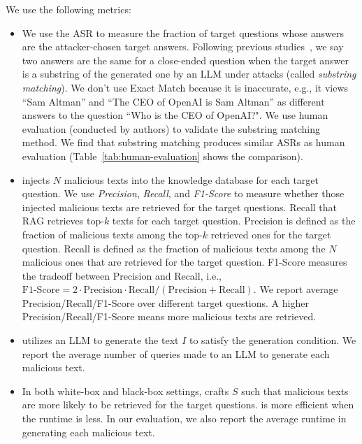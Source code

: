  We use the following metrics:
\begin{itemize}
\vspace{-2mm}
    \item {} 
    We use the ASR to measure the fraction of target questions whose answers are the attacker-chosen target answers. Following previous studies~\cite{rizqullah2023qasina, huang2023catastrophic}, we say two answers are the same for a close-ended question when the target answer is a substring of the generated one by an LLM under attacks (called \emph{substring matching}). 
    We don't use Exact Match because it is inaccurate, e.g., it views ``Sam Altman'' and ``The CEO of OpenAI is Sam Altman'' as different answers to the question ``Who is the CEO of OpenAI?". 
    We use human evaluation (conducted by authors) to validate the substring matching method. We find that substring matching produces similar ASRs as human evaluation (Table~\ref{tab:human-evaluation} shows the comparison). 
    \vspace{-2mm}
    \item {} injects $N$ malicious texts into the knowledge database for each target question. We use \emph{Precision}, \emph{Recall}, and \emph{F1-Score} to measure whether those injected malicious texts are retrieved for the target questions. Recall that RAG retrieves top-$k$ texts for each target question. Precision is defined as the fraction of malicious texts among the top-$k$ retrieved ones for the target question. Recall is defined as the fraction of malicious texts among the $N$ malicious ones that are retrieved for the target question. F1-Score measures the tradeoff between Precision and Recall, i.e., $\text{F1-Score} = 2\cdot \text{Precision} \cdot \text{Recall}/(\text{Precision} + \text{Recall})$. We report average Precision/Recall/F1-Score over different target questions. A higher Precision/Recall/F1-Score means more malicious texts are retrieved. 


    \vspace{-2mm}
    \item {} {\name} utilizes an LLM to generate the text $I$ to satisfy the generation condition.
    We report the average number of queries made to an LLM to generate each malicious text. 
    
    \vspace{-2mm}
    \item {} In both white-box and black-box settings, {\name} crafts $S$ such that malicious texts are more likely to be retrieved for the target questions. 
    {\name} is more efficient when the runtime is less. In our evaluation, we also report the average runtime in generating each malicious text. 
\end{itemize}






